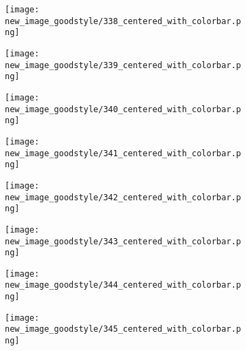 \documentclass[a4paper,12pt]{article}
\begin{document}
\begin{figure}[H]
  \begin{subfigure}{0.11\textwidth}
    \texttt{[image: new\_image\_goodstyle/338\_centered\_with\_colorbar.png]}
  \end{subfigure}
  \hfill
  \begin{subfigure}{0.11\textwidth}
    \texttt{[image: new\_image\_goodstyle/339\_centered\_with\_colorbar.png]}
  \end{subfigure}
  \hfill
  \begin{subfigure}{0.11\textwidth}
    \texttt{[image: new\_image\_goodstyle/340\_centered\_with\_colorbar.png]}
  \end{subfigure}
  \hfill
  \begin{subfigure}{0.11\textwidth}
    \texttt{[image: new\_image\_goodstyle/341\_centered\_with\_colorbar.png]}
  \end{subfigure}
  \hfill
  \begin{subfigure}{0.11\textwidth}
    \texttt{[image: new\_image\_goodstyle/342\_centered\_with\_colorbar.png]}
  \end{subfigure}
  \hfill
  \begin{subfigure}{0.11\textwidth}
    \texttt{[image: new\_image\_goodstyle/343\_centered\_with\_colorbar.png]}
  \end{subfigure}
  \hfill
  \begin{subfigure}{0.11\textwidth}
    \texttt{[image: new\_image\_goodstyle/344\_centered\_with\_colorbar.png]}
  \end{subfigure}
  \hfill
  \begin{subfigure}{0.11\textwidth}
    \texttt{[image: new\_image\_goodstyle/345\_centered\_with\_colorbar.png]}
  \end{subfigure}
  \hfill
\end{figure}
\end{document}
